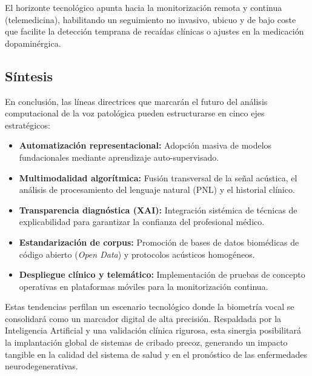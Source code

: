 El horizonte tecnológico apunta hacia la monitorización remota y continua (telemedicina), habilitando un seguimiento no invasivo, ubicuo y de bajo coste que facilite la detección temprana de recaídas clínicas o ajustes en la medicación dopaminérgica.

\subsection{Síntesis}
En conclusión, las líneas directrices que marcarán el futuro del análisis computacional de la voz patológica pueden estructurarse en cinco ejes estratégicos:

\begin{itemize}
    \item \textbf{Automatización representacional:} Adopción masiva de modelos fundacionales mediante aprendizaje auto-supervisado.
    \item \textbf{Multimodalidad algorítmica:} Fusión transversal de la señal acústica, el análisis de procesamiento del lenguaje natural (PNL) y el historial clínico.
    \item \textbf{Transparencia diagnóstica (XAI):} Integración sistémica de técnicas de explicabilidad para garantizar la confianza del profesional médico.
    \item \textbf{Estandarización de corpus:} Promoción de bases de datos biomédicas de código abierto (\textit{Open Data}) y protocolos acústicos homogéneos.
    \item \textbf{Despliegue clínico y telemático:} Implementación de pruebas de concepto operativas en plataformas móviles para la monitorización continua.
\end{itemize}

Estas tendencias perfilan un escenario tecnológico donde la biometría vocal se consolidará como un marcador digital de alta precisión. Respaldada por la Inteligencia Artificial y una validación clínica rigurosa, esta sinergia posibilitará la implantación global de sistemas de cribado precoz, generando un impacto tangible en la calidad del sistema de salud y en el pronóstico de las enfermedades neurodegenerativas.